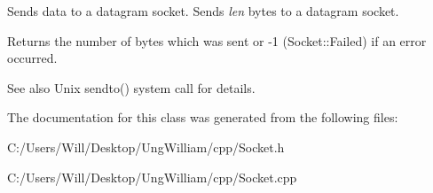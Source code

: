 Sends data to a datagram socket. Sends {\itshape len} bytes to a datagram socket. 

\begin{DoxyReturn}{Returns}
the number of bytes which was sent or -\/1 (Socket\+::\+Failed) if an error occurred. 
\end{DoxyReturn}
\begin{DoxySeeAlso}{See also}
Unix sendto() system call for details. 
\end{DoxySeeAlso}


The documentation for this class was generated from the following files\+:\begin{DoxyCompactItemize}
\item 
C\+:/\+Users/\+Will/\+Desktop/\+Ung\+William/cpp/Socket.\+h\item 
C\+:/\+Users/\+Will/\+Desktop/\+Ung\+William/cpp/Socket.\+cpp\end{DoxyCompactItemize}
